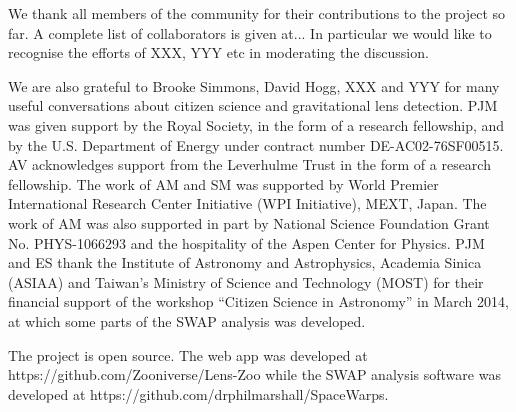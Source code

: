 We thank all \Ncollaboration members of the \sw community for their
contributions to the project so far. A complete list of collaborators is
given at... In particular we would like to recognise the efforts of XXX,
YYY etc in moderating the discussion.

We are also grateful to Brooke Simmons, David Hogg, XXX and YYY for many useful
conversations about citizen science and gravitational lens detection. 
%
PJM was given support by the Royal Society, in the form of a research
fellowship, and by the U.S. Department of Energy under contract number DE-AC02-76SF00515.
%
AV acknowledges support from the Leverhulme Trust in the form of a research
fellowship.
%
The work of AM and SM was supported by World Premier International Research
Center Initiative (WPI Initiative), MEXT, Japan. The work of AM was also supported in
part by National Science Foundation Grant No. PHYS-1066293 and the hospitality
of the Aspen Center for Physics. 
%
% 
PJM and ES thank the Institute of Astronomy and Astrophysics, Academia Sinica
(ASIAA) and Taiwan's Ministry of Science and Technology (MOST) for their
financial support of the workshop ``Citizen Science in Astronomy'' in March
2014, at which some parts of the SWAP analysis was developed.


The \sw project is open source. 
The web app was developed at https://github.com/Zooniverse/Lens-Zoo
while the SWAP analysis software was developed at
https://github.com/drphilmarshall/SpaceWarps.
